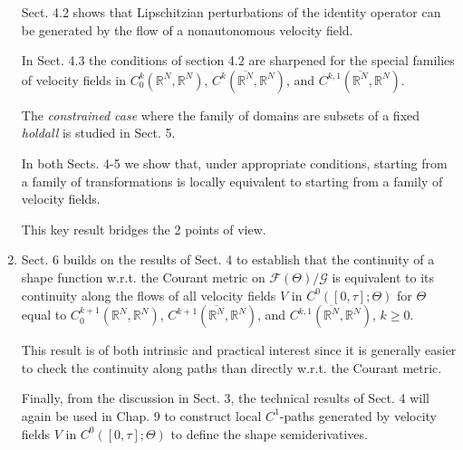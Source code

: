 \documentclass{book}
\numberwithin{equation}{section}
\begin{document}
\begin{enumerate}
    Sect. 4.2 shows that Lipschitzian perturbations of the identity operator can be generated by the flow of a nonautonomous velocity field.
    
    In Sect. 4.3 the conditions of section 4.2 are sharpened for the special families of velocity fields in $C_0^k(\mathbb{R}^N,\mathbb{R}^N)$, $C^k(\overline{\mathbb{R}^N},\mathbb{R}^N)$, and $C^{k,1}(\overline{\mathbb{R}^N},\mathbb{R}^N)$.
    
    The \textit{constrained case} where the family of domains are subsets of a fixed \textit{holdall} is studied in Sect. 5.
    
    In both Sects. 4-5 we show that, under appropriate conditions, starting from a family of transformations is locally equivalent to starting from a family of velocity fields.
    
    This key result bridges the 2 points of view.
    \item Sect. 6 builds on the results of Sect. 4 to establish that the continuity of a shape function w.r.t. the Courant metric on $\mathcal{F}(\Theta)/\mathcal{G}$ is equivalent to its continuity along the flows of all velocity fields $V$ in $C^0([0,\tau];\Theta)$ for $\Theta$ equal to $C_0^{k+1}(\mathbb{R}^N,\mathbb{R}^N)$, $C^{k+1}(\overline{\mathbb{R}^N},\mathbb{R}^N)$, and $C^{k,1}(\overline{\mathbb{R}^N},\mathbb{R}^N)$, $k\ge 0$.
    
    This result is of both intrinsic and practical interest since it is generally easier to check the continuity along paths than directly w.r.t. the Courant metric.
    
    Finally, from the discussion in Sect. 3, the technical results of Sect. 4 will again be used in Chap. 9 to construct local $C^1$-paths generated by velocity fields $V$ in $C^0([0,\tau];\Theta)$ to define the shape semiderivatives.
\end{enumerate}
\end{document}
